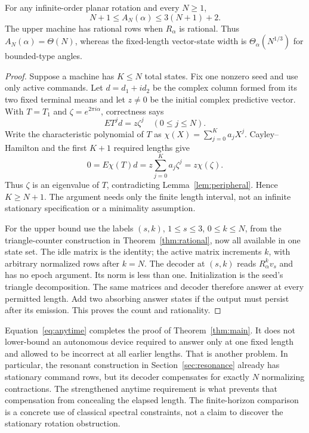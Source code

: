 \begin{theorem}\label{thm:autonomous}
For any infinite-order planar rotation and every $N\ge1$,
\begin{equation}\label{eq:anytime}
                         N+1\le A_N(\alpha)\le3(N+1)+2.
\end{equation}
The upper machine has rational rows when $R_\alpha$ is rational.
Thus $A_N(\alpha)=\Theta(N)$, whereas the fixed-length vector-state
width is $\Theta_\alpha(N^{1/3})$ for bounded-type angles.
\end{theorem}
\begin{proof}
Suppose a machine has $K\le N$ total states. Fix one nonzero seed and
use only active commands. Let $d=d_1+i d_2$ be the complex column formed
from its two fixed terminal means and let $z\ne0$ be the initial
complex predictive vector. With $T=T_1$ and $\zeta=e^{2\pi i\alpha}$,
correctness says
\[
                         E T^j d=z\zeta^j\quad(0\le j\le N).
\]
Write the characteristic polynomial of $T$ as
$\chi(X)=\sum_{j=0}^K a_jX^j$. Cayley--Hamilton and the first $K+1$
required lengths give
\[
             0=E\chi(T)d=z\sum_{j=0}^K a_j\zeta^j=z\chi(\zeta).
\]
Thus $\zeta$ is an eigenvalue of $T$, contradicting
Lemma~\ref{lem:peripheral}. Hence $K\ge N+1$.
The argument needs only the finite length interval, not an infinite
stationary specification or a minimality assumption.

For the upper bound use the labels $(s,k)$, $1\le s\le3$, $0\le k\le N$,
from the triangle-counter construction in Theorem~\ref{thm:rational},
now all available in one state set. The idle matrix is the identity;
the active matrix increments $k$, with arbitrary normalized rows after
$k=N$. The decoder at $(s,k)$ reads $R_\alpha^k v_s$ and has no epoch
argument. Its norm is less than one. Initialization is the seed's
triangle decomposition. The same matrices and decoder therefore answer
at every permitted length. Add two absorbing answer states if the output
must persist after its emission. This proves the count and rationality.
\end{proof}

Equation~\eqref{eq:anytime} completes the proof of
Theorem~\ref{thm:main}. It does not lower-bound an autonomous device
required to answer only at one fixed length and allowed to be incorrect
at all earlier lengths. That is another problem. In particular, the
resonant construction in Section~\ref{sec:resonance} already has
stationary command rows, but its decoder compensates for exactly $N$
normalizing contractions. The strengthened anytime requirement is what
prevents that compensation from concealing the elapsed length.
The finite-horizon comparison is a concrete use of classical spectral
constraints, not a claim to discover the stationary rotation obstruction.
